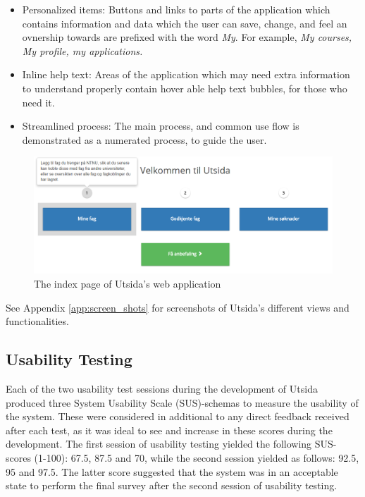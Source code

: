 \begin{itemize}
    \item Personalized items: Buttons and links to parts of the application which contains information and data which the user can save, change, and feel an ovnership towards are prefixed with the word \emph{My}. For example, \emph{My courses, My profile, my applications.}
    \item Inline help text: Areas of the application which may need extra information to understand properly contain hover able help text bubbles, for those who need it.
    \item Streamlined process: The main process, and common use flow is demonstrated as a numerated process, to guide the user.
\end{itemize}

\begin{figure}[h]
    \centering
    \includegraphics[width=1\textwidth]{fig/utsida_screenshots/steps.png}
    \caption{The index page of Utsida's web application}
    \label{fig:utsida_index}
\end{figure}

See Appendix \ref{app:screen_shots} for screenshots of Utsida's different views and functionalities.

\subsection{Usability Testing}
Each of the two usability test sessions during the development of Utsida produced three System Usability Scale (SUS)-schemas to measure the usability of the system. These were considered in additional to any direct feedback received after each test, as it was ideal to see and increase in these scores during the development. The first session of usability testing yielded the following SUS-scores (1-100): 67.5, 87.5 and 70, while the second session yielded as follows: 92.5, 95 and 97.5. The latter score suggested that the system was in an acceptable state to perform the final survey after the second session of usability testing.

